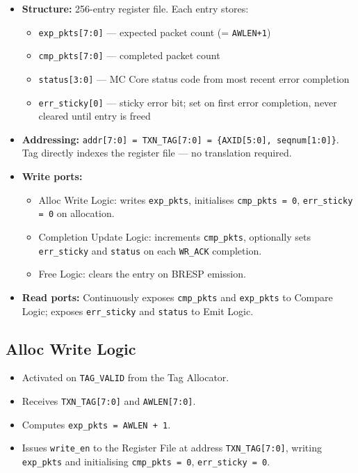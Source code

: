 \documentclass[11pt,a4paper]{article}
\begin{document}
\begin{itemize}
  \item \textbf{Structure:} 256-entry register file. Each entry stores:
  \begin{itemize}
    \item \texttt{exp\_pkts[7:0]} — expected packet count (= \texttt{AWLEN+1})
    \item \texttt{cmp\_pkts[7:0]} — completed packet count
    \item \texttt{status[3:0]} — MC Core status code from most recent
          error completion
    \item \texttt{err\_sticky[0]} — sticky error bit; set on first
          error completion, never cleared until entry is freed
  \end{itemize}
  \item \textbf{Addressing:} \texttt{addr[7:0] = TXN\_TAG[7:0] =
        \{AXID[5:0], seqnum[1:0]\}}. Tag directly indexes the register
        file — no translation required.
  \item \textbf{Write ports:}
  \begin{itemize}
    \item Alloc Write Logic: writes \texttt{exp\_pkts}, initialises
          \texttt{cmp\_pkts = 0}, \texttt{err\_sticky = 0} on
          allocation.
    \item Completion Update Logic: increments \texttt{cmp\_pkts},
          optionally sets \texttt{err\_sticky} and \texttt{status} on
          each \texttt{WR\_ACK} completion.
    \item Free Logic: clears the entry on BRESP emission.
  \end{itemize}
  \item \textbf{Read ports:} Continuously exposes \texttt{cmp\_pkts}
        and \texttt{exp\_pkts} to Compare Logic; exposes
        \texttt{err\_sticky} and \texttt{status} to Emit Logic.
\end{itemize}

\subsection{Alloc Write Logic}

\begin{itemize}
  \item Activated on \texttt{TAG\_VALID} from the Tag Allocator.
  \item Receives \texttt{TXN\_TAG[7:0]} and \texttt{AWLEN[7:0]}.
  \item Computes \texttt{exp\_pkts = AWLEN + 1}.
  \item Issues \texttt{write\_en} to the Register File at address
        \texttt{TXN\_TAG[7:0]}, writing \texttt{exp\_pkts} and
        initialising \texttt{cmp\_pkts = 0}, \texttt{err\_sticky = 0}.
\end{itemize}
\end{document}
